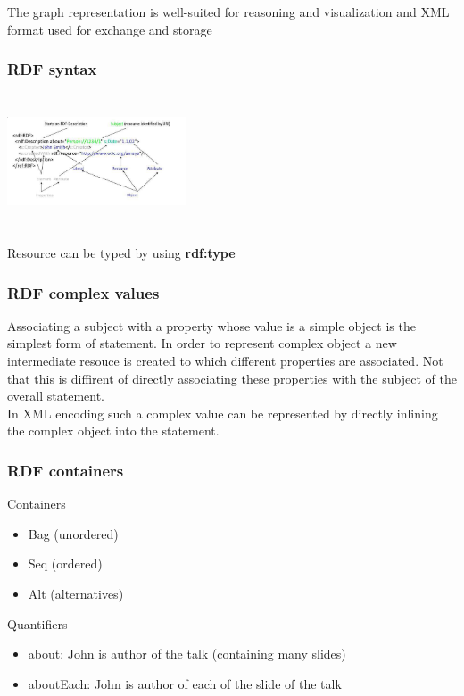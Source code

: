 The graph representation is well-suited for reasoning and
visualization and XML format used for exchange and storage

\subsubsection{RDF syntax}
\includegraphics[width=200px, height=150px]{rdfsynt}

Resource can be typed by using \textbf{rdf:type}

\subsubsection{RDF complex values}

Associating a subject with a property whose value is a simple object
is the simplest form of statement. In order to represent complex
object a new intermediate resouce is created to which different
properties are associated. Not that this is diffirent of directly
associating these properties with the subject of the overall
statement.\\
In XML encoding such a complex value can be represented by directly
inlining the complex object into the statement.

\subsubsection{RDF containers}
Containers
\begin{itemize}
\item Bag (unordered)
\item Seq (ordered)
\item Alt (alternatives)
\end{itemize}

Quantifiers
\begin{itemize}
\item about: John is author of the talk (containing many slides)
\item aboutEach: John is author of each of the slide of the talk
\end{itemize}

